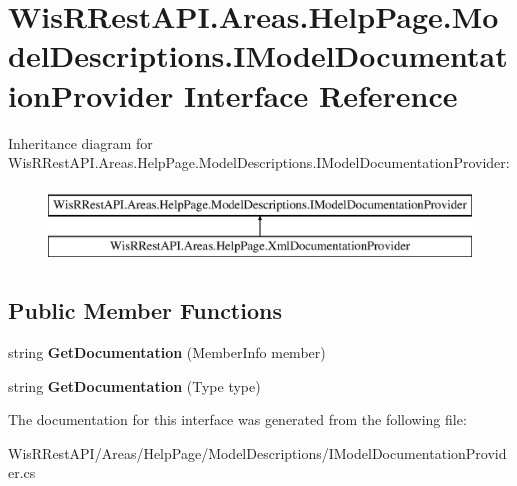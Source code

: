 \hypertarget{interface_wis_r_rest_a_p_i_1_1_areas_1_1_help_page_1_1_model_descriptions_1_1_i_model_documentation_provider}{}\section{Wis\+R\+Rest\+A\+P\+I.\+Areas.\+Help\+Page.\+Model\+Descriptions.\+I\+Model\+Documentation\+Provider Interface Reference}
\label{interface_wis_r_rest_a_p_i_1_1_areas_1_1_help_page_1_1_model_descriptions_1_1_i_model_documentation_provider}
Inheritance diagram for Wis\+R\+Rest\+A\+P\+I.\+Areas.\+Help\+Page.\+Model\+Descriptions.\+I\+Model\+Documentation\+Provider\+:\begin{figure}[H]
\begin{center}
\leavevmode
\includegraphics[height=2.000000cm]{interface_wis_r_rest_a_p_i_1_1_areas_1_1_help_page_1_1_model_descriptions_1_1_i_model_documentation_provider}
\end{center}
\end{figure}
\subsection*{Public Member Functions}
\begin{DoxyCompactItemize}
\item 
\hypertarget{interface_wis_r_rest_a_p_i_1_1_areas_1_1_help_page_1_1_model_descriptions_1_1_i_model_documentation_provider_a1a7a3d696aa41dbc06347ab0ade798be}{}string {\bfseries Get\+Documentation} (Member\+Info member)\label{interface_wis_r_rest_a_p_i_1_1_areas_1_1_help_page_1_1_model_descriptions_1_1_i_model_documentation_provider_a1a7a3d696aa41dbc06347ab0ade798be}

\item 
\hypertarget{interface_wis_r_rest_a_p_i_1_1_areas_1_1_help_page_1_1_model_descriptions_1_1_i_model_documentation_provider_a32b41407627790de8e164a2afe402bcb}{}string {\bfseries Get\+Documentation} (Type type)\label{interface_wis_r_rest_a_p_i_1_1_areas_1_1_help_page_1_1_model_descriptions_1_1_i_model_documentation_provider_a32b41407627790de8e164a2afe402bcb}

\end{DoxyCompactItemize}


The documentation for this interface was generated from the following file\+:\begin{DoxyCompactItemize}
\item 
Wis\+R\+Rest\+A\+P\+I/\+Areas/\+Help\+Page/\+Model\+Descriptions/I\+Model\+Documentation\+Provider.\+cs\end{DoxyCompactItemize}
